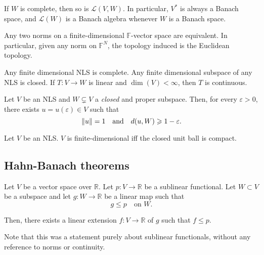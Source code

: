 \documentclass[12pt]{article}	%
\begin{document}
\begin{prop}
	If $W$ is complete, then so is $\mathcal{L}(V, W)$. In particular, $V^{\ast}$ is always a Banach space, and $\mathcal{L}(W)$ is a Banach algebra whenever $W$ is a Banach space.
\end{prop}

\begin{prop}
	Any two norms on a finite-dimensional $\mathbb{F}$-vector space are equivalent. In particular, given any norm on $\mathbb{F}^{N}$, the topology induced is the Euclidean topology.
\end{prop}

\begin{cor}
	Any finite dimensional NLS is complete. Any finite dimensional subspace of any NLS is closed. If $T : V \to W$ is linear and $\dim(V) < \infty$, then $T$ is continuous.
\end{cor}

\begin{thm}
	Let $V$ be an NLS and $W \subsetneq V$ a \emph{closed} and proper subspace. Then, for every $\varepsilon > 0$, there exists $u = u(\varepsilon) \in V$ such that
	\begin{equation*} 
		\|u\| = 1 \quad\text{and}\quad d(u, W) \geqslant 1 - \varepsilon.
	\end{equation*}
\end{thm}

\begin{prop}
	Let $V$ be an NLS. $V$ is finite-dimensional iff the closed unit ball is compact.
\end{prop}

\subsection{Hahn-Banach theorems}

\begin{thm}
	Let $V$ be a vector space over $\mathbb{R}$. Let $p : V \to \mathbb{R}$ be a sublinear functional. Let $W \subset V$ be a subspace and let $g : W \to \mathbb{R}$ be a linear map such that
	\begin{equation*} 
		g \le p \quad \text{on $W$.}
	\end{equation*}

	Then, there exists a linear extension $f : V \to \mathbb{R}$ of $g$ such that $f \le p$.
\end{thm}
Note that this was a statement purely about sublinear functionals, without any reference to norms or continuity.
\end{document}
